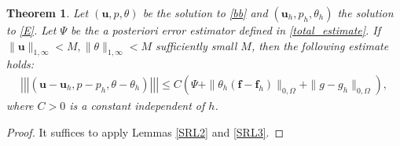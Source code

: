 \documentclass[10pt,a4paper]{article}
\newtheorem{theorem} {\bf Theorem}
\begin{document}
 \begin{theorem}
Let $(\boldsymbol{u}, p, \theta)$ be the solution to \eqref{bb} and $(\boldsymbol{u}_h, p_h, \theta_h)$ the solution to \eqref{E}. Let $\Psi$ be the a posteriori error estimator defined in \eqref{total_estimate}. If $\| \boldsymbol{u}\|_{1,\infty} < M, \| \theta \|_{1,\infty} < M$ sufficiently small $M$, then the following estimate holds:
\begin{align*}
    \left|\!\left|\!\left| (\boldsymbol{u}-\boldsymbol{u}_h , p -p_h, \theta - \theta_h)\right|\!\right|\!\right| \leq C \left(\Psi + \| \theta_h ( \boldsymbol{f} - \boldsymbol{f}_h) \|_{0,\Omega} + \| g -g_h\|_{0,\Omega} \right),
\end{align*}
where $C > 0$ is a constant independent of $h$.
 \end{theorem}
\begin{proof}
    It suffices to apply Lemmas \ref{SRL2} and \ref{SRL3}.
\end{proof}
\end{document}
